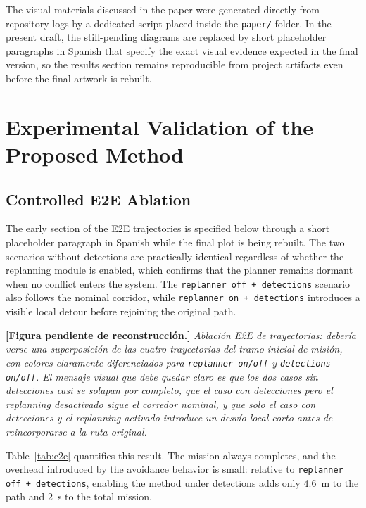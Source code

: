 \documentclass[a4paper,11pt]{article}
\newcommand{\diagramplaceholder}[1]{\par\smallskip\noindent\textbf{[Figura pendiente de reconstrucción.] } \emph{#1}\par\smallskip}
\begin{document}
The visual materials discussed in the paper were generated directly from repository logs by a dedicated script placed inside the \texttt{paper/} folder. In the present draft, the still-pending diagrams are replaced by short placeholder paragraphs in Spanish that specify the exact visual evidence expected in the final version, so the results section remains reproducible from project artifacts even before the final artwork is rebuilt.

\section{Experimental Validation of the Proposed Method}

\subsection{Controlled E2E Ablation}

The early section of the E2E trajectories is specified below through a short placeholder paragraph in Spanish while the final plot is being rebuilt. The two scenarios without detections are practically identical regardless of whether the replanning module is enabled, which confirms that the planner remains dormant when no conflict enters the system. The \texttt{replanner off + detections} scenario also follows the nominal corridor, while \texttt{replanner on + detections} introduces a visible local detour before rejoining the original path.

\diagramplaceholder{Ablación E2E de trayectorias: debería verse una superposición de las cuatro trayectorias del tramo inicial de misión, con colores claramente diferenciados para \texttt{replanner on/off} y \texttt{detections on/off}. El mensaje visual que debe quedar claro es que los dos casos sin detecciones casi se solapan por completo, que el caso con detecciones pero el replanning desactivado sigue el corredor nominal, y que solo el caso con detecciones y el replanning activado introduce un desvío local corto antes de reincorporarse a la ruta original.}

Table~\ref{tab:e2e} quantifies this result. The mission always completes, and the overhead introduced by the avoidance behavior is small: relative to \texttt{replanner off + detections}, enabling the method under detections adds only \SI{4.6}{\meter} to the path and \SI{2}{\second} to the total mission.
\end{document}
